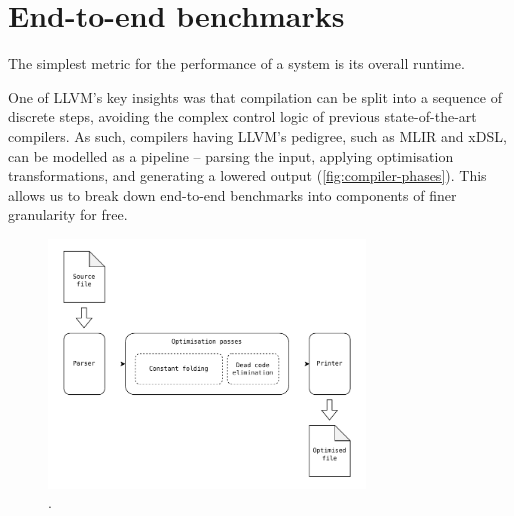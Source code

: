 \section{End-to-end benchmarks}

The simplest metric for the performance of a system is its overall runtime.

One of LLVM's key insights was that compilation can be split into a sequence of discrete steps, avoiding the complex control logic of previous state-of-the-art compilers.
As such, compilers having LLVM's pedigree, such as MLIR and xDSL, can be modelled as a pipeline -- parsing the input, applying optimisation transformations, and generating a lowered output (\autoref{fig:compiler-phases}).
This allows us to break down end-to-end benchmarks into components of finer granularity for free.


\begin{figure}
    \centering
    \includegraphics[width=0.75\textwidth]{images/14_measuring_compiler_performance/compiler_phases.drawio.pdf}
    \caption{.}
    \label{fig:compiler-phases}
\end{figure}










